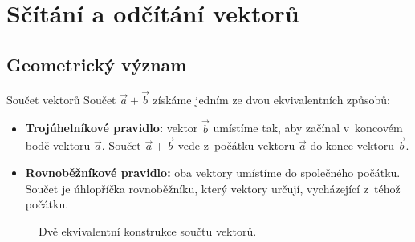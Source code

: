 \documentclass[a4paper,11pt]{article}
\begin{document}
\section{Sčítání a odčítání vektorů}

\subsection{Geometrický význam}

\begin{definice}{Součet vektorů}
Součet $\vec a+\vec b$ získáme jedním ze dvou ekvivalentních způsobů:
\begin{itemize}
  \item \textbf{Trojúhelníkové pravidlo:} vektor $\vec b$ umístíme tak, aby začínal
        v~koncovém bodě vektoru $\vec a$. Součet $\vec a+\vec b$ vede z~počátku
        vektoru $\vec a$ do konce vektoru $\vec b$.
  \item \textbf{Rovnoběžníkové pravidlo:} oba vektory umístíme do společného počátku.
        Součet je úhlopříčka rovnoběžníku, který vektory určují, vycházející
        z~téhož počátku.
\end{itemize}
\end{definice}

\begin{figure}[!htbp]
\centering
{}
\caption{Dvě ekvivalentní konstrukce součtu vektorů.}
\end{figure}
\end{document}

